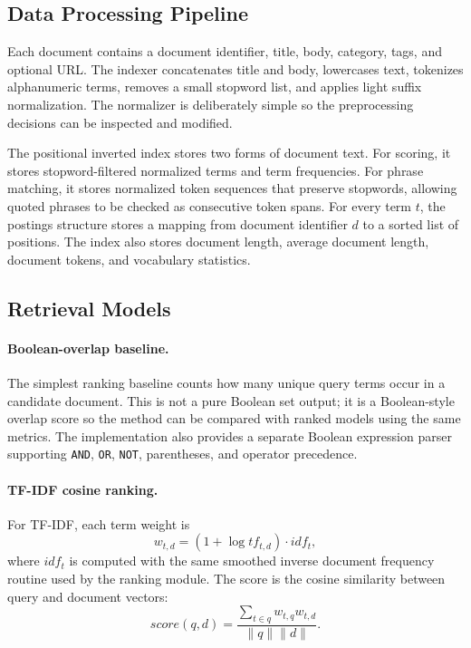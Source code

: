 \documentclass[sigconf,nonacm]{acmart}
\begin{document}
\subsection{Data Processing Pipeline}
Each document contains a document identifier, title, body, category, tags, and optional URL. The indexer concatenates title and body, lowercases text, tokenizes alphanumeric terms, removes a small stopword list, and applies light suffix normalization. The normalizer is deliberately simple so the preprocessing decisions can be inspected and modified.

The positional inverted index stores two forms of document text. For scoring, it stores stopword-filtered normalized terms and term frequencies. For phrase matching, it stores normalized token sequences that preserve stopwords, allowing quoted phrases to be checked as consecutive token spans. For every term $t$, the postings structure stores a mapping from document identifier $d$ to a sorted list of positions. The index also stores document length, average document length, document tokens, and vocabulary statistics.

\subsection{Retrieval Models}
\paragraph{Boolean-overlap baseline.} The simplest ranking baseline counts how many unique query terms occur in a candidate document. This is not a pure Boolean set output; it is a Boolean-style overlap score so the method can be compared with ranked models using the same metrics. The implementation also provides a separate Boolean expression parser supporting \texttt{AND}, \texttt{OR}, \texttt{NOT}, parentheses, and operator precedence.

\paragraph{TF-IDF cosine ranking.} For TF-IDF, each term weight is
\begin{equation}
  w_{t,d} = (1 + \log tf_{t,d}) \cdot idf_t,
\end{equation}
where $idf_t$ is computed with the same smoothed inverse document frequency routine used by the ranking module. The score is the cosine similarity between query and document vectors:
\begin{equation}
  score(q,d) = \frac{\sum_{t \in q} w_{t,q} w_{t,d}}{\lVert q \rVert \lVert d \rVert}.
\end{equation}
\end{document}
